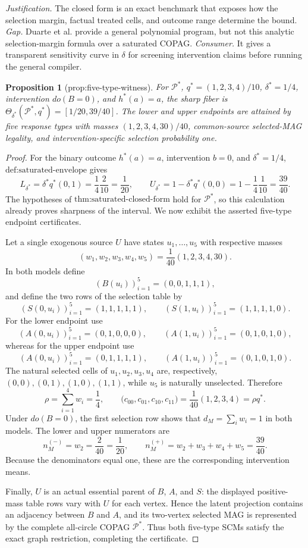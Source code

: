 \documentclass{article}
\newtheorem{proposition}{Proposition}
\begin{document}
\par\smallskip\noindent \textit{Justification.} The closed form is an exact benchmark that exposes how the selection margin, factual treated cells, and outcome range determine the bound. \textit{Gap.} Duarte et al. provide a general polynomial program, but not this analytic selection-margin formula over a saturated COPAG. \textit{Consumer.} It gives a transparent sensitivity curve in \(\delta\) for screening intervention claims before running the general compiler.

\begin{proposition}[prop:five-type-witness]\label{prop:five-type-witness}
For \(\mathcal P^*\), \(q^*=(1,2,3,4)/10\), \(\delta^*=1/4\), intervention \(do(B=0)\), and \(h^*(a)=a\), the sharp fiber is \(\Theta_{\delta^*}(\mathcal P^*,q^*)=[1/20,39/40]\). The lower and upper endpoints are attained by five response types with masses \((1,2,3,4,30)/40\), common-source selected-MAG legality, and intervention-specific selection probability one.
\end{proposition}
\begin{proof}
For the binary outcome \(h^*(a)=a\), intervention \(b=0\), and \(\delta^*=1/4\), \(\text{def:saturated-envelope}\) gives
\[
L_{\delta^*}=\delta^*q^*(0,1)=\frac14\frac2{10}=\frac1{20},
\qquad
U_{\delta^*}=1-\delta^*q^*(0,0)=1-\frac14\frac1{10}=\frac{39}{40}.
\]
The hypotheses of \(\text{thm:saturated-closed-form}\) hold for \(\mathcal P^*\), so this calculation already proves sharpness of the interval.  We now exhibit the asserted five-type endpoint certificates.

Let a single exogenous source \(U\) have states \(u_1,\ldots,u_5\) with respective masses
\[
(w_1,w_2,w_3,w_4,w_5)=\frac1{40}(1,2,3,4,30).
\]
In both models define
\[
(B(u_i))_{i=1}^5=(0,0,1,1,1),
\]
and define the two rows of the selection table by
\[
(S(0,u_i))_{i=1}^5=(1,1,1,1,1),
\qquad
(S(1,u_i))_{i=1}^5=(1,1,1,1,0).
\]
For the lower endpoint use
\[
(A(0,u_i))_{i=1}^5=(0,1,0,0,0),
\qquad
(A(1,u_i))_{i=1}^5=(0,1,0,1,0),
\]
whereas for the upper endpoint use
\[
(A(0,u_i))_{i=1}^5=(0,1,1,1,1),
\qquad
(A(1,u_i))_{i=1}^5=(0,1,0,1,0).
\]
The natural selected cells of \(u_1,u_2,u_3,u_4\) are, respectively, \((0,0),(0,1),(1,0),(1,1)\), while \(u_5\) is naturally unselected.  Therefore
\[
\rho=\sum_{i=1}^4w_i=\frac14,
\qquad
\bigl(c_{00},c_{01},c_{10},c_{11}\bigr)=\frac1{40}(1,2,3,4)=\rho q^*.
\]
Under \(do(B=0)\), the first selection row shows that \(d_M=\sum_iw_i=1\) in both models.  The lower and upper numerators are
\[
n_M^{(-)}=w_2=\frac2{40}=\frac1{20},
\qquad
n_M^{(+)}=w_2+w_3+w_4+w_5=\frac{39}{40}.
\]
Because the denominators equal one, these are the corresponding intervention means.

Finally, \(U\) is an actual essential parent of \(B\), \(A\), and \(S\): the displayed positive-mass table rows vary with \(U\) for each vertex.  Hence the latent projection contains an adjacency between \(B\) and \(A\), and its two-vertex selected MAG is represented by the complete all-circle COPAG \(\mathcal P^*\).  Thus both five-type SCMs satisfy the exact graph restriction, completing the certificate.
\end{proof}
\end{document}
